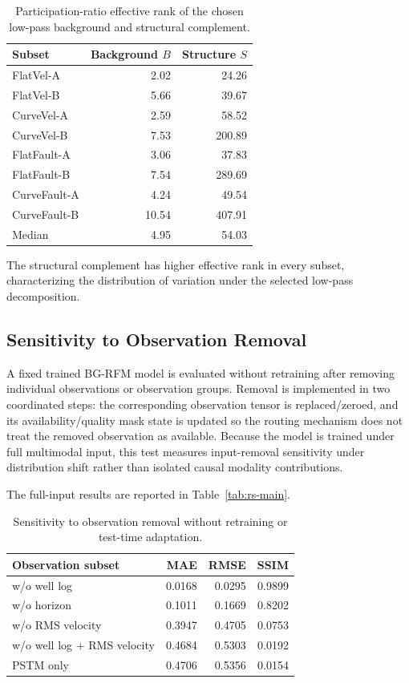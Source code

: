 \begin{table}[H]
\centering
\caption{Participation-ratio effective rank of the chosen low-pass background and structural complement.}\label{tab:appendix-rank}
\begin{tabular}{lrr}
\toprule
Subset & Background $B$ & Structure $S$ \\
\midrule
FlatVel-A & 2.02 & 24.26 \\
FlatVel-B & 5.66 & 39.67 \\
CurveVel-A & 2.59 & 58.52 \\
CurveVel-B & 7.53 & 200.89 \\
FlatFault-A & 3.06 & 37.83 \\
FlatFault-B & 7.54 & 289.69 \\
CurveFault-A & 4.24 & 49.54 \\
CurveFault-B & 10.54 & 407.91 \\
\midrule
Median & 4.95 & 54.03 \\
\bottomrule
\end{tabular}
\end{table}

The structural complement has higher effective rank in every subset, characterizing the distribution of variation under the selected low-pass decomposition.

\subsection{Sensitivity to Observation Removal}

A fixed trained BG-RFM model is evaluated without retraining after removing individual observations or observation groups. Removal is implemented in two coordinated steps: the corresponding observation tensor is replaced/zeroed, and its availability/quality mask state is updated so the routing mechanism does not treat the removed observation as available. Because the model is trained under full multimodal input, this test measures input-removal sensitivity under distribution shift rather than isolated causal modality contributions.

The full-input results are reported in Table~\ref{tab:rs-main}.

\begin{table}[t]
\centering
\caption{Sensitivity to observation removal without retraining or test-time adaptation.}\label{tab:appendix-observation-removal}
\begin{tabular}{lrrr}
\toprule
Observation subset & MAE & RMSE & SSIM \\
\midrule
w/o well log & 0.0168 & 0.0295 & 0.9899 \\
w/o horizon & 0.1011 & 0.1669 & 0.8202 \\
w/o RMS velocity & 0.3947 & 0.4705 & 0.0753 \\
w/o well log + RMS velocity & 0.4684 & 0.5303 & 0.0192 \\
PSTM only & 0.4706 & 0.5356 & 0.0154 \\
\bottomrule
\end{tabular}
\end{table}

